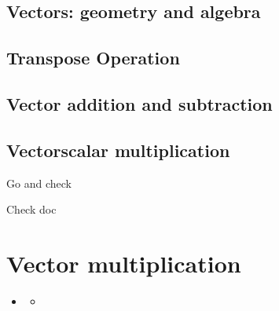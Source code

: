 \documentclass[letterpaper,10pt,english]{sphinxmanual}
\begin{document}
\section{Vectors: geometry and algebra}
\label{\detokenize{LinearAlgebra/Vectors:vectors-geometry-and-algebra}}

\section{Transpose Operation}
\label{\detokenize{LinearAlgebra/Vectors:transpose-operation}}

\section{Vector addition and subtraction}
\label{\detokenize{LinearAlgebra/Vectors:vector-addition-and-subtraction}}

\section{Vector\sphinxhyphen{}scalar multiplication}
\label{\detokenize{LinearAlgebra/Vectors:vector-scalar-multiplication}}
\sphinxAtStartPar
Go and check {\hyperref[\detokenize{LinearAlgebra/Introduction:introductioncode}]{}}

\sphinxAtStartPar
Check doc {\hyperref[\detokenize{LinearAlgebra/Introduction::doc}]{}}


\chapter{Vector multiplication}
\label{\detokenize{LinearAlgebra/VectorMultiplication:vector-multiplication}}\label{\detokenize{LinearAlgebra/VectorMultiplication::doc}}
\begin{sphinxShadowBox}
\begin{itemize}
\item {} 
\sphinxAtStartPar
{}\label{\detokenize{LinearAlgebra/VectorMultiplication:id1}}{\hyperref[\detokenize{LinearAlgebra/VectorMultiplication:vector-multiplication}]{}}
\begin{itemize}
\item {} 
\sphinxAtStartPar
{}\label{\detokenize{LinearAlgebra/VectorMultiplication:id2}}{\hyperref[\detokenize{LinearAlgebra/VectorMultiplication:vector-dot-product-algebra}]{}}

\end{itemize}

\end{itemize}
\end{sphinxShadowBox}
\end{document}
